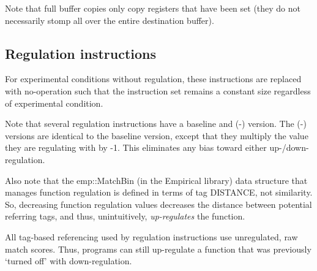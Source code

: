 \documentclass[
]{book}
\begin{document}
Note that full buffer copies only copy registers that have been set (they do not necessarily stomp all over the entire destination buffer).

\hypertarget{regulation-instructions}{%
\subsection{Regulation instructions}\label{regulation-instructions}}

For experimental conditions without regulation, these instructions are replaced with no-operation
such that the instruction set remains a constant size regardless of experimental condition.

Note that several regulation instructions have a baseline and (-) version.
The (-) versions are identical to the baseline version, except that they multiply the value they are
regulating with by -1. This eliminates any bias toward either up-/down-regulation.

Also note that the emp::MatchBin (in the Empirical library) data structure that manages function regulation
is defined in terms of tag DISTANCE, not similarity. So, decreasing function regulation values decreases
the distance between potential referring tags, and thus, unintuitively, \emph{up-regulates} the function.

All tag-based referencing used by regulation instructions use unregulated, raw match scores. Thus, programs
can still up-regulate a function that was previously `turned off' with down-regulation.
\end{document}

